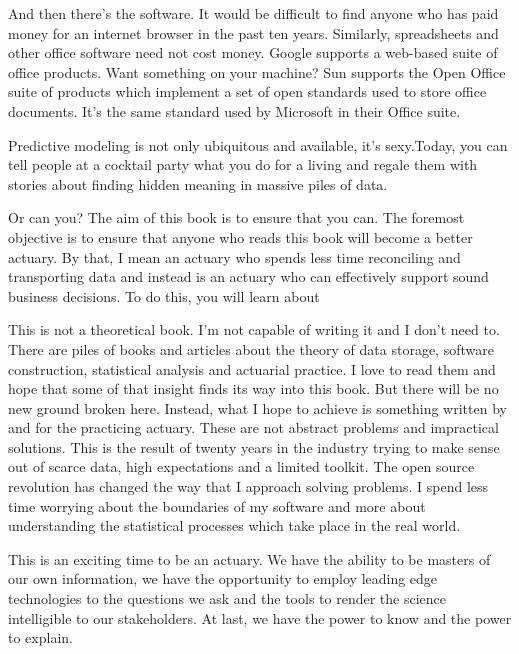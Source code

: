 And then there's the software. It would be difficult to find anyone who has paid money for an internet browser in the past ten years. Similarly, spreadsheets and other office software need not cost money. Google supports a web-based suite of office products. Want something on your machine? Sun supports the Open Office suite of products which implement a set of open standards used to store office documents. It's the same standard used by Microsoft in their Office suite. 

Predictive modeling is not only ubiquitous and available, it's sexy.Today, you can tell people at a cocktail party what you do for a living and regale them with stories about finding hidden meaning in massive piles of data.

Or can you? The aim of this book is to ensure that you can. The foremost objective is to ensure that anyone who reads this book will become a better actuary. By that, I mean an actuary who spends less time reconciling and transporting data and instead is an actuary who can effectively support sound business decisions. To do this, you will learn about 

This is not a theoretical book. I'm not capable of writing it and I don't need to. There are piles of books and articles about the theory of data storage, software construction, statistical analysis and actuarial practice. I love to read them and hope that some of that insight finds its way into this book. But there will be no new ground broken here. Instead, what I hope to achieve is something written by and for the practicing actuary. These are not abstract problems and impractical solutions. This is the result of twenty years in the industry trying to make sense out of scarce data, high expectations and a limited toolkit. The open source revolution has changed the way that I approach solving problems. I spend less time worrying about the boundaries of my software and more about understanding the statistical processes which take place in the real world. 

This is an exciting time to be an actuary. We have the ability to be masters of our own information, we have the opportunity to employ leading edge technologies to the questions we ask and the tools to render the science intelligible to our stakeholders. At last, we have the power to know and the power to explain. 